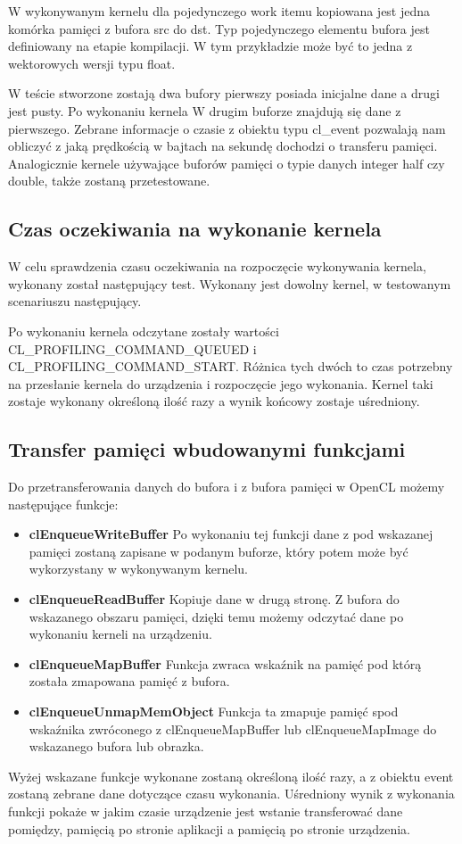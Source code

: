 
 
W wykonywanym kernelu dla pojedynczego work itemu kopiowana jest jedna komórka pamięci z bufora src do dst. Typ pojedynczego elementu bufora jest definiowany na etapie kompilacji. W tym przykładzie może być to jedna z wektorowych wersji typu float.

W teście stworzone zostają dwa bufory pierwszy posiada inicjalne dane a drugi jest pusty. Po wykonaniu kernela W drugim buforze znajdują się dane z pierwszego. Zebrane informacje o czasie z obiektu typu cl\_event pozwalają nam obliczyć z jaką prędkością w bajtach na sekundę dochodzi o transferu pamięci.
Analogicznie kernele używające buforów pamięci o typie danych integer half czy double, także zostaną przetestowane.

\subsection[Czas oczekiwania na wykonanie kernela]{Czas oczekiwania na wykonanie kernela}
W celu sprawdzenia czasu oczekiwania na rozpoczęcie wykonywania kernela, wykonany został następujący test. Wykonany jest dowolny kernel, w testowanym scenariuszu następujący.



Po wykonaniu kernela odczytane zostały wartości CL\_PROFILING\_COMMAND\_QUEUED i CL\_PROFILING\_COMMAND\_START. Różnica tych dwóch to czas potrzebny na przesłanie kernela do urządzenia i rozpoczęcie jego wykonania. Kernel taki zostaje wykonany określoną ilość razy a wynik końcowy zostaje uśredniony.
\subsection[Transfer pamięci wbudowanymi funkcjami]{Transfer pamięci wbudowanymi funkcjami}
Do przetransferowania danych do bufora i z bufora pamięci w OpenCL możemy następujące funkcje:
 \begin{itemize}
	\item \textbf{clEnqueueWriteBuffer} Po wykonaniu tej funkcji dane z pod wskazanej pamięci zostaną zapisane w podanym buforze, który potem może być wykorzystany w wykonywanym kernelu.
	\item \textbf{clEnqueueReadBuffer} Kopiuje dane w drugą stronę. Z bufora do wskazanego obszaru pamięci, dzięki temu możemy odczytać dane po wykonaniu kerneli na urządzeniu.
	\item \textbf{clEnqueueMapBuffer} Funkcja zwraca wskaźnik na pamięć pod którą została zmapowana pamięć z bufora.
	\item \textbf{clEnqueueUnmapMemObject} Funkcja ta zmapuje pamięć spod wskaźnika zwróconego z clEnqueueMapBuffer lub clEnqueueMapImage do wskazanego bufora lub obrazka.
\end{itemize}
Wyżej wskazane funkcje wykonane zostaną określoną ilość razy, a z obiektu event zostaną zebrane dane dotyczące czasu wykonania. Uśredniony wynik z wykonania funkcji pokaże w jakim czasie urządzenie jest wstanie transferować dane pomiędzy, pamięcią po stronie aplikacji a pamięcią po stronie urządzenia.
